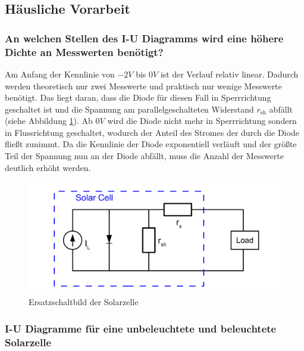 \documentclass[a4paper]{scrartcl}
\numberwithin{equation}{subsection}
\begin{document}
\subsection{Häusliche Vorarbeit}
\subsubsection{An welchen Stellen des I-U Diagramms wird eine höhere Dichte an Messwerten benötigt?}
Am Anfang der Kennlinie von $-2V$ bis $0V$ ist der Verlauf relativ linear. Dadurch werden theoretisch nur
zwei Messwerte und praktisch nur wenige Messwerte benötigt. Das liegt daran, dass die Diode für diesen
Fall in Sperrrichtung geschaltet ist und die Spannung am parallelgeschalteten Widerstand $r_{\text{sh}}$
abfällt (siehe Abbildung \ref{fig:ESB_Solar}). Ab $0V$ wird die Diode nicht mehr in Sperrrichtung sondern
in Flussrichtung geschaltet, wodurch der Anteil des Stromes der durch die Diode fließt zunimmt.
Da die Kennlinie der Diode exponentiell verläuft und der größte Teil der Spannung nun an der Diode
abfällt, muss die Anzahl der Messwerte deutlich erhöht werden.

\begin{figure}[H]
\includegraphics[width=16cm]{ESB_Solarzelle}
\centering
\caption{Ersatzschaltbild der Solarzelle \cite{anl}}
\centering
\label{fig:ESB_Solar}
\end{figure}

\subsubsection{I-U Diagramme für eine unbeleuchtete und beleuchtete Solarzelle}
\end{document}
